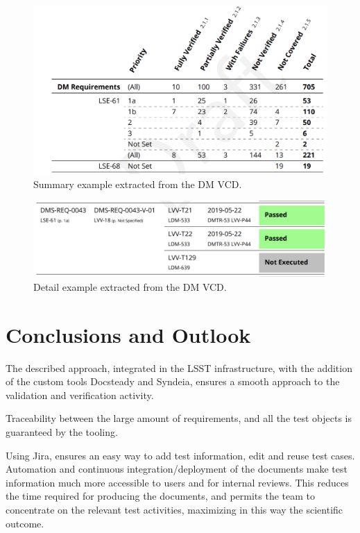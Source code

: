 \begin{figure}
\begin{center}
\includegraphics[width=\textwidth]{imgs/VCDsumm.png}
 \caption{Summary example extracted from the DM VCD.}
 \label{fig:vcdsum}
\end{center}
\end{figure}

\begin{figure}
\begin{center}
\includegraphics[width=\textwidth]{imgs/VCDdetail.png}
 \caption{Detail example extracted from the DM VCD.}
 \label{fig:vcddetail}
\end{center}
\end{figure}

\section{Conclusions and Outlook}

The described approach, integrated in the LSST infrastructure, with the addition of the custom tools Docsteady and Syndeia, 
ensures a smooth approach to the validation and verification activity. 

Traceability between the large amount of requirements, and all the test objects is guaranteed by the tooling.

Using Jira, ensures an easy way to add test information, edit and reuse test cases.
Automation and continuous integration/deployment of the documents make test information much more accessible to users and for internal reviews.
This reduces the time required for producing the documents, and permits the team to concentrate on the relevant test activities, maximizing in this way the scientific outcome.

